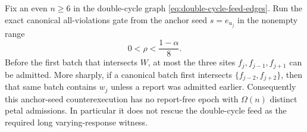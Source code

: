 \begin{proposition}
\label{prop:double-cycle-anchor-seed-obstruction}
Fix an even $n\geq6$ in the double-cycle graph
\cref{eq:double-cycle-feed-edges}.  Run the exact canonical all-violations
gate from the anchor seed $s=e_{u_j}$ in the nonempty range
\begin{equation*}
 0<\rho<\frac{1-\alpha}{8}.
\end{equation*}
Before the first batch that intersects $W$, at most the three sites
$f_j,f_{j-1},f_{j+1}$ can be admitted.  More sharply, if a canonical batch
first intersects $\{f_{j-2},f_{j+2}\}$, then that same batch contains $w_j$
unless a report was admitted earlier.  Consequently this anchor-seed
counterexecution has no report-free epoch with $\Omega(n)$ distinct petal
admissions.  In particular it does not rescue the double-cycle feed as the
required long varying-response witness.
\end{proposition}

